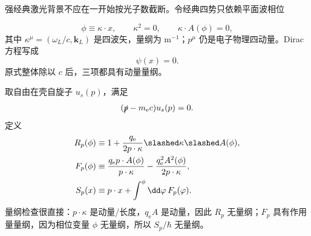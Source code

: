 \begin{derivation}
强经典激光背景不应在一开始按光子数截断。令经典四势只依赖平面波相位

\begin{equation*}
 \phi\equiv\kappa\cdot x,
 \qquad
 \kappa^2=0,
 \qquad
 \kappa\cdot A(\phi)=0,
 \end{equation*}
其中 $\kappa^\mu=(\omega_L/c,\mathbf k_L)$ 是四波矢，量纲为 $\mathrm{m^{-1}}$；$p^\mu$ 仍是电子物理四动量。Dirac 方程写成
\begin{equation*}
 [\ii\hbar\slashed\partial-q_{\mathrm e}\slashed A(\phi)-m_{\mathrm e} c]\psi(x)=0.
 \end{equation*}
原式整体除以 $c$ 后，三项都具有动量量纲。

取自由在壳自旋子 $u_s(p)$，满足
\begin{equation*}
 (\slashed p-m_{\mathrm e} c)u_s(p)=0.
\end{equation*}
定义
\begin{align*}
 R_p(\phi)
 &\equiv
 1+\frac{q_{\mathrm e}}{2p\cdot\kappa}
 \slashed\kappa\slashed A(\phi),\\
 F_p(\phi)
 &\equiv
 \frac{q_{\mathrm e} p\cdot A(\phi)}{p\cdot\kappa}
 -\frac{q_{\mathrm e}^2A^2(\phi)}{2p\cdot\kappa},\\
 S_p(x)
 &\equiv p\cdot x+\int^{\phi}\dd\varphi\,F_p(\varphi).
 \end{align*}
量纲检查很直接：$p\cdot\kappa$ 是动量/长度，$q_{\mathrm e} A$ 是动量，因此 $R_p$ 无量纲；$F_p$ 具有作用量量纲，因为相位变量 $\phi$ 无量纲，所以 $S_p/\hbar$ 无量纲。


\end{derivation}

